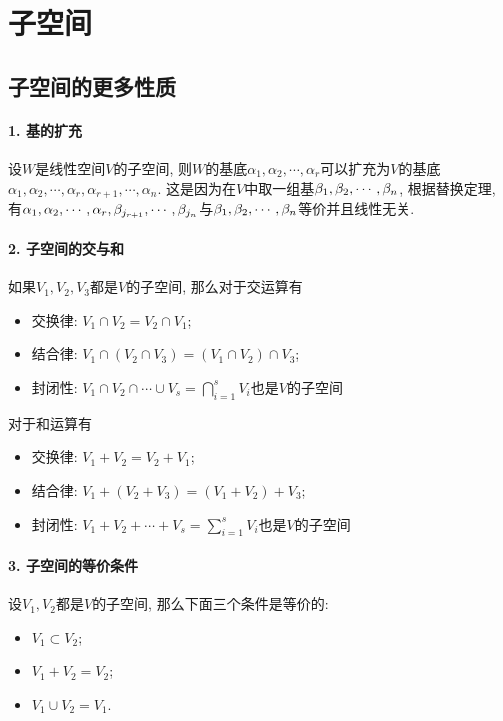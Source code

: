 \documentclass{ctexart}
\begin{document}
\section{子空间}

\subsection{子空间的更多性质}

\paragraph{1. 基的扩充} 设$W$是线性空间$V$的子空间, 则$W$的基底$\alpha_1, \alpha_2,\cdots, \alpha_r$可以扩充为$V$的基底$\alpha_1, \alpha_2,\cdots, \alpha_r,\alpha_{r+1},\cdots, \alpha_n$. 
这是因为在$V$中取一组基${{\beta}_1, {\beta}_2,\cdots, {\beta}_{n}}$, 根据替换定理, 有${{\alpha}_1, {\alpha}_2,\cdots, {\alpha}_{r}},\beta_{j_{r+1}},\cdots, \beta_{j_n}$与${{\beta}_1, {\beta}_2,\cdots, {\beta}_{n}}$等价并且线性无关. 

\paragraph{2. 子空间的交与和} 如果$V_1, V_2, V_3$都是$V$的子空间, 那么对于交运算有
\begin{itemize}
    \item 交换律: $V_1\cap V_2 = V_2 \cap V_1$;
    \item 结合律: $V_1 \cap (V_2 \cap V_3)=(V_1\cap V_2)\cap V_3$;
    \item 封闭性: $V_1\cap V_2\cap \cdots \cup V_s =\bigcap_{i=1}^s V_i$也是$V$的子空间
\end{itemize}
对于和运算有
\begin{itemize}
    \item 交换律: $V_1+V_2=V_2+V_1$;
    \item 结合律: $V_1 + (V_2 + V_3)=(V_1 + V_2)+ V_3$;
    \item 封闭性: $V_1+V_2+ \cdots + V_s =\sum_{i=1}^s V_i$也是$V$的子空间
\end{itemize}

\paragraph{3. 子空间的等价条件} 设$V_1, V_2$都是$V$的子空间, 那么下面三个条件是等价的:
\begin{itemize}
    \item $V_1\subset V_2$;
    \item $V_1+V_2=V_2$;
    \item $V_1\cup V_2=V_1$.
\end{itemize}
\end{document}
